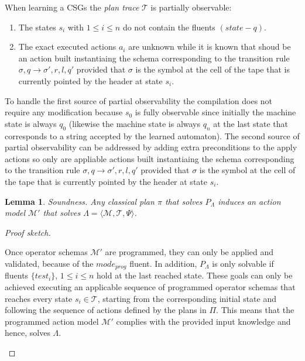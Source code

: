 \documentclass[letterpaper]{article} %
\newcommand{\tup}[1]{{\langle #1 \rangle}}
\newtheorem{lemma}[theorem]{Lemma}
\begin{document}
When learning a CSGs the {\em plan trace} $\mathcal{T}$ is partially observable:
\begin{enumerate}
\item The states $s_i$ with $1\leq i\leq n$ do not contain the fluents $(state-q)$.
\item The exact executed actions $a_i$ are unknown while it is known that shoud be an action built instantiaing the schema corresponding to the transition rule $\sigma,q\rightarrow \sigma',{r,l},q'$ provided that $\sigma$ is the symbol at the cell of the tape that is currently pointed by the header at state $s_i$.
\end{enumerate}
To handle the first source of partial observability the compilation does not require any modification because $s_0$ is fully observable since initially the machine state is always $q_0$ (likewise the machine state is always $q_n$ at the last state that corresponds to a string accepted by the learned automaton). The second source of partial observability can be addressed by adding extra preconditions to the apply actions so only are appliable actions built instantiaing the schema corresponding to the transition rule $\sigma,q\rightarrow \sigma',{r,l},q'$ provided that $\sigma$ is the symbol at the cell of the tape that is currently pointed by the header at state $s_i$.

\begin{lemma}
Soundness. Any classical plan $\pi$ that solves $P_{\Lambda}$ induces an action model $\mathcal{M}'$ that solves $\Lambda=\tup{\mathcal{M},\mathcal{T},\Psi}$.
\end{lemma}

\begin{proof}[Proof sketch]
\begin{small}
Once operator schemas $\mathcal{M}'$ are programmed, they can only be applied and validated, because of the $mode_{prog}$ fluent. In addition, $P_{\Lambda}$ is only solvable if fluents $\{test_i\}$, {\small $1\leq i\leq n$} hold at the last reached state. These goals can only be achieved executing an applicable sequence of programmed operator schemas that reaches every state $s_i\in\mathcal{T}$, starting from the corresponding initial state and following the sequence of actions defined by the plans in $\Pi$. This means that the programmed action model $\mathcal{M}'$ complies with the provided input knowledge and hence, solves $\Lambda$.
\end{small}
\end{proof}
\end{document}
